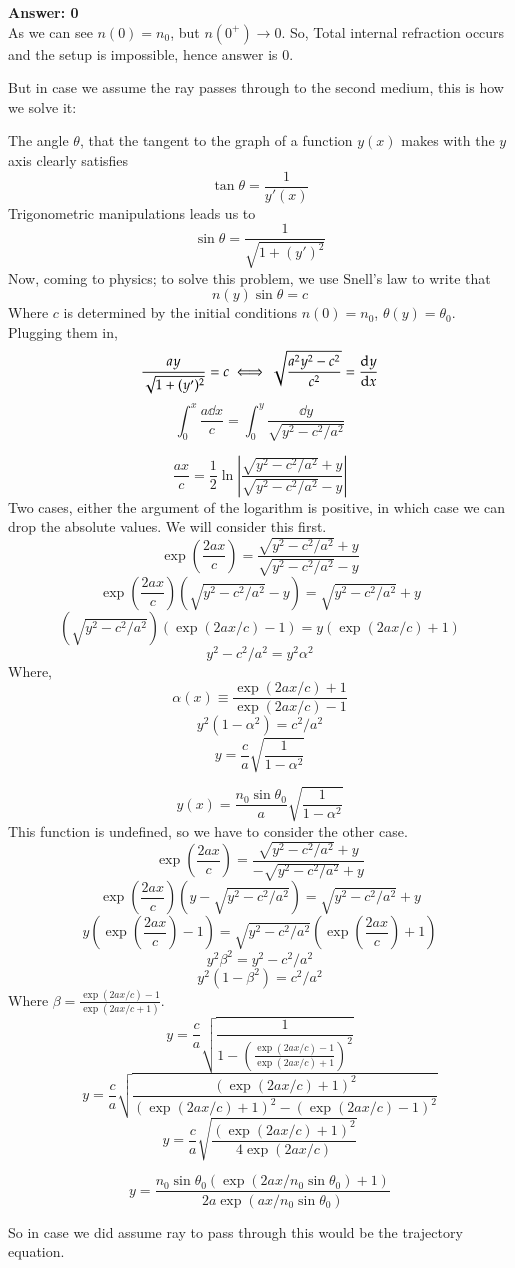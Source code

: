 \documentclass[11pt,a4paper]{scrartcl}
\begin{document}
\begin{solution}
{\Large{\textbf{Answer: 0}}}\\
As we can see $n(0)=n_0$, but $n(0^{+})\to 0$. So, Total internal refraction occurs and the setup is impossible, hence answer is 0.

But in case we assume the ray passes through to the second medium, this is how we solve it:





The angle $\theta$, that the tangent to the graph of a function $y(x)$ makes with the $y$ axis clearly satisfies
$$\tan\theta=\frac{1}{y'(x)}$$
Trigonometric manipulations leads us to 
$$\sin\theta=\frac{1}{\sqrt{1+(y')^2}}$$
Now, coming to physics; to solve this problem, we use Snell's law to write that
\begin{equation*}
    n(y)\sin\theta=c
\end{equation*}
Where $c$ is determined by the initial conditions $n(0)=n_0$, $\theta(y)=\theta_0$. Plugging them in,
$$\frac{ay}{\sqrt{1+(y')^2}}=c\iff\sqrt{\frac{a^2y^2-c^2}{c^2
}}=\dv{y}{x}$$
$$\int_0^x\frac{a\dd x}{c}=\int_0^{y}\frac{\dd y}{\sqrt{y^2-c^2/a^2}}$$

$$\frac{ax}{c}=\frac{1}{2}\ln\left|\frac{\sqrt{y^2-c^2/a^2}+y}{\sqrt{y^2-c^2/a^2}-y}\right|$$
Two cases, either the argument of the logarithm is positive, in which case we can drop the absolute values. We will consider this first.
$$\exp\left(\frac{2ax}{c}\right)=\frac{\sqrt{y^2-c^2/a^2}+y}{\sqrt{y^2-c^2/a^2}-y}$$
$$\exp\left(\frac{2ax}{c}\right)(\sqrt{y^2-c^2/a^2}-y)=\sqrt{y^2-c^2/a^2}+y$$
$$(\sqrt{y^2-c^2/a^2})(\exp(2ax/c)-1)=y(\exp(2ax/c)+1)$$
$$y^2-c^2/a^2=y^2\alpha^2$$
Where, $$\alpha(x)\equiv\frac{\exp(2ax/c)+1}{\exp(2ax/c)-1}$$
$$y^2(1-\alpha^2)=c^2/a^2$$
$$y=\frac{c}{a}\sqrt{\frac{1}{1-\alpha^2}}$$

\begin{equation*}
    \boxed{y(x)=\frac{n_0\sin\theta_0}{a}\sqrt{\frac{1}{1-\alpha^2}}}
\end{equation*}
This function is undefined, so we have to consider the other case.
$$\exp\left(\frac{2ax}{c}\right)=\frac{\sqrt{y^2-c^2/a^2}+y}{-\sqrt{y^2-c^2/a^2}+y}$$
$$\exp\left(\frac{2ax}{c}\right)(y-\sqrt{y^2-c^2/a^2})=\sqrt{y^2-c^2/a^2}+y$$
$$y(\exp\left(\frac{2ax}{c}\right)-1)=\sqrt{y^2-c^2/a^2}(\exp\left(\frac{2ax}{c}\right)+1)$$
$$y^2\beta^2=y^2-c^2/a^2$$
$$y^2(1-\beta^2)=c^2/a^2$$
Where $\beta=\frac{\exp(2ax/c)-1}{\exp(2ax/c+1)}$.
$$y=\frac{c}{a}\sqrt{\frac{1}{1-(\frac{\exp(2ax/c)-1}{\exp(2ax/c)+1})^2}}$$
$$y=\frac{c}{a}\sqrt{\frac{(\exp(2ax/c)+1)^2}{(\exp(2ax/c)+1)^2-(\exp(2ax/c)-1)^2}}$$
$$y=\frac{c}{a}\sqrt{\frac{(\exp(2ax/c)+1)^2}{4\exp(2ax/c)}}$$

$$y=\frac{n_0\sin\theta_0
(\exp(2ax/n_0\sin\theta_0)+1)}{2a\exp(ax/n_0\sin\theta_0)}$$

So in case we did assume ray to pass through this would be the trajectory equation.
\end{solution}
\vspace{10mm}%
\end{document}
